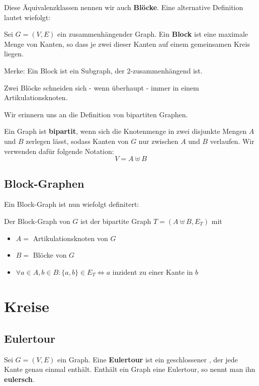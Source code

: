 \documentclass[a4paper]{report}
\begin{document}
Diese Äquivalenzklassen nennen wir auch \textbf{Blöcke}. Eine alternative Definition lautet wiefolgt:

\begin{definition}
    Sei $G = (V,E)$ ein zusammenhängender Graph. Ein \textbf{Block} ist eine maximale Menge von Kanten, so
    dass je zwei dieser Kanten auf einem gemeinsamen Kreis liegen.
\end{definition}
\bigskip

Merke: Ein Block ist ein Subgraph, der 2-zusammenhängend ist.

\begin{lemma}
    Zwei Blöcke schneiden sich - wenn überhaupt - immer in einem Artikulationsknoten.
\end{lemma}
\bigskip

Wir erinnern uns an die Definition von bipartiten Graphen.

\begin{definition}
    Ein Graph ist \textbf{bipartit}, wenn sich die Knotenmenge in zwei disjunkte Mengen
    $A$ und $B$ zerlegen lässt, sodass Kanten von $G$ nur zwischen $A$ und $B$ verlaufen.
    Wir verwenden dafür folgende Notation:
    $$V = A \uplus B$$
\end{definition}
\bigskip

\section{Block-Graphen}
Ein Block-Graph ist nun wiefolgt definitert:

\begin{definition}
    Der Block-Graph von $G$ ist der bipartite Graph $T = (A \uplus B, E_T )$ mit
    \begin{itemize}
        \item $A =$ {Artikulationsknoten von $G$}
        \item $B =$ {Blöcke von $G$}
        \item $\forall a \in A , b \in B: \{a,b\} \in E_T \Leftrightarrow a$ inzident zu einer Kante in $b$
    \end{itemize}
\end{definition}
\bigskip

\chapter{Kreise}
\section{Eulertour}
\begin{definition}
    Sei $G = (V,E)$ ein Graph. Eine \textbf{Eulertour} ist ein geschlossener , der jede Kante genau
    einmal enthält. Enthält ein Graph eine Eulertour, so nennt man ihn \textbf{eulersch}.
\end{definition}
\bigskip
\end{document}
